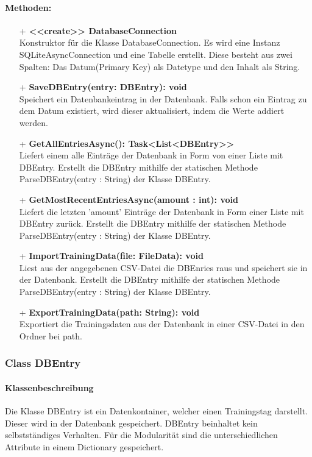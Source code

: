 \documentclass[a4paper,12pt]{article}
\begin{document}
	\paragraph{Methoden:}
	\begin{itemize}
		\item[+] \textbf{<<create>> DatabaseConnection}\\Konstruktor für die Klasse DatabaseConnection. Es wird eine Instanz SQLiteAsyncConnection und eine Tabelle erstellt. Diese besteht aus zwei Spalten: Das Datum(Primary Key) als Datetype und den Inhalt als String.
		\item[+] \textbf{SaveDBEntry(entry: DBEntry): void}\\Speichert ein Datenbankeintrag in der \gls{Datenbank}. Falls schon ein Eintrag zu dem Datum existiert, wird dieser aktualisiert, indem die Werte addiert werden.\\
		\item[+] \textbf{GetAllEntriesAsync(): Task<List<DBEntry>>}\\Liefert einem alle Einträge der Datenbank in Form von einer Liste mit DBEntry. Erstellt die DBEntry mithilfe der statischen Methode ParseDBEntry(entry : String) der Klasse DBEntry.\\ 
		\item[+] \textbf{GetMostRecentEntriesAsync(amount : int): void}\\Liefert  die letzten 'amount' Einträge der Datenbank in Form einer Liste mit DBEntry zurück. Erstellt die DBEntry mithilfe der statischen Methode ParseDBEntry(entry : String) der Klasse DBEntry.\\
		\item[+] \textbf{ImportTrainingData(file: FileData): void}\\Liest aus der angegebenen \gls{CSV}-Datei die DBEnries raus und speichert sie in der \gls{Datenbank}. Erstellt die DBEntry mithilfe der statischen Methode ParseDBEntry(entry : String) der Klasse DBEntry.\\
		\item[+] \textbf{ExportTrainingData(path: String): void}\\Exportiert die Trainingsdaten aus der \gls{Datenbank} in einer \gls{CSV}-Datei in den Ordner bei path. \\
	\end{itemize}
\subsubsection{Class DBEntry}
	\paragraph{Klassenbeschreibung}
	Die Klasse DBEntry ist ein Datenkontainer, welcher einen Trainingstag darstellt. Dieser wird in der Datenbank gespeichert. DBEntry beinhaltet kein selbstständiges Verhalten. Für die Modularität sind die unterschiedlichen Attribute in einem Dictionary gespeichert.
	
\end{document}
